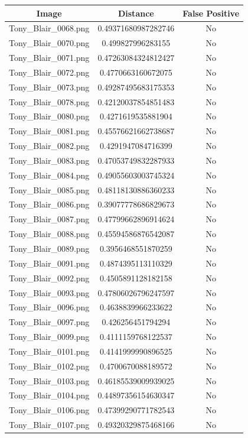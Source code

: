 \documentclass[12pt]{article}
\begin{document}
\begin{center}
\begin{tabular}{ccc}
Image & Distance & False Positive \\
\hline
Tony\_Blair\_0068.png & 0.49371680987282746 & No\\
Tony\_Blair\_0070.png & 0.499827996283155 & No\\
Tony\_Blair\_0071.png & 0.47263084324812427 & No\\
Tony\_Blair\_0072.png & 0.4770663160672075 & No\\
Tony\_Blair\_0073.png & 0.49287495683175353 & No\\
Tony\_Blair\_0078.png & 0.42120037854851483 & No\\
Tony\_Blair\_0080.png & 0.4271619535881904 & No\\
Tony\_Blair\_0081.png & 0.45576621662738687 & No\\
Tony\_Blair\_0082.png & 0.4291947084716399 & No\\
Tony\_Blair\_0083.png & 0.47053749832287933 & No\\
Tony\_Blair\_0084.png & 0.49055603003745324 & No\\
Tony\_Blair\_0085.png & 0.48118130886360233 & No\\
Tony\_Blair\_0086.png & 0.39077778686829673 & No\\
Tony\_Blair\_0087.png & 0.47799662896914624 & No\\
Tony\_Blair\_0088.png & 0.45594586876542087 & No\\
Tony\_Blair\_0089.png & 0.3956468551870259 & No\\
Tony\_Blair\_0091.png & 0.4874395113110329 & No\\
Tony\_Blair\_0092.png & 0.4505891128182158 & No\\
Tony\_Blair\_0093.png & 0.47806026796247597 & No\\
Tony\_Blair\_0096.png & 0.4638839966233622 & No\\
Tony\_Blair\_0097.png & 0.426256451794294 & No\\
Tony\_Blair\_0099.png & 0.4111159768122537 & No\\
Tony\_Blair\_0101.png & 0.4141999990896525 & No\\
Tony\_Blair\_0102.png & 0.4700670088189572 & No\\
Tony\_Blair\_0103.png & 0.46185539009939025 & No\\
Tony\_Blair\_0104.png & 0.44897356154630347 & No\\
Tony\_Blair\_0106.png & 0.47399290771782543 & No\\
Tony\_Blair\_0107.png & 0.49320329875468166 & No\\

\end{tabular}
\end{center}
\end{document}
